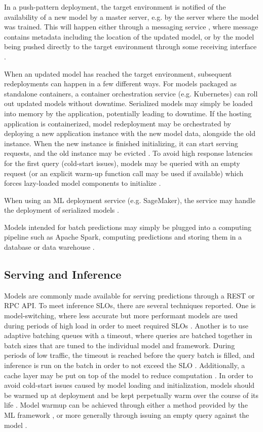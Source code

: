 In a push-pattern deployment, the target environment is notified of the availability of a new model by a master server, e.g. by the server where the model was trained.
This will happen either through a messaging service \cite{Liu2020, Garcia2020}, where message contains metadata including the location of the updated model, or by the model being pushed directly to the target environment through some receiving interface \cite{Paeaekkoenen2020}.

When an updated model has reached the target environment, subsequent redeployments can happen in a few different ways.
For models packaged as standalone containers, a container orchestration service (e.g. Kubernetes) can roll out updated models without downtime.
Serialized models may simply be loaded into memory by the application, potentially leading to downtime.
If the hosting application is containerized, model redeployment may be orchestrated by deploying a new application instance with the new model data, alongside the old instance.
When the new instance is finished initializing, it can start serving requests, and the old instance may be evicted \cite{Paeaekkoenen2020}.
To avoid high response latencies for the first query (cold-start issues), models may be queried with an empty request (or an explicit warm-up function call may be used if available) which forces lazy-loaded model components to initialize \cite{Li2017}.

When using an ML deployment service (e.g. SageMaker), the service may handle the deployment of serialized models \cite{Chahal2020}.

Models intended for batch predictions may simply be plugged into a computing pipeline such as Apache Spark, computing predictions and storing them in a database or data warehouse \cite{Li2017}.

\subsection{Serving and Inference}
Models are commonly made available for serving predictions through a REST \cite{Krishnamurthi2019, Liu2020, Ruf2021, Garcia2020, Crankshaw2017, Paeaekkoenen2020} or RPC \cite{Ruf2021, Li2017, Crankshaw2017} API.
To meet inference SLOs, there are several techniques reported.
One is model-switching, where less accurate but more performant models are used during periods of high load in order to meet required SLOs \cite{Zhang2020}.
Another is to use adaptive batching queues with a timeout, where queries are batched together in batch sizes that are tuned to the individual model and framework. During periods of low traffic, the timeout is reached before the query batch is filled, and inference is run on the batch in order to not exceed the SLO \cite{Crankshaw2017}.
Additionally, a cache layer may be put on top of the model to reduce computation \cite{Crankshaw2017}.
In order to avoid cold-start issues caused by model loading and initialization, models should be warmed up at deployment and be kept perpetually warm over the course of its life \cite{Zhang2020}.
Model warmup can be achieved through either a method provided by the ML framework \cite{Li2017}, or more generally through issuing an empty query against the model \cite{Garcia2020}.

